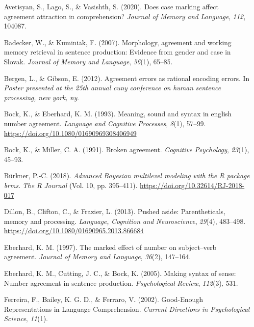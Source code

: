 \documentclass[
  english,
  doc,floatsintext]{apa6}
\newlength{\cslhangindent}
\newenvironment{cslreferences}%
  {\setlength{\parindent}{0pt}%
  \everypar{\setlength{\hangindent}{\cslhangindent}}\ignorespaces}%
  {\par}
\begin{document}
\hypertarget{refs}{}
\begin{cslreferences}
\leavevmode\hypertarget{ref-AvetisyanEtAl:2020}{}%
Avetisyan, S., Lago, S., \& Vasishth, S. (2020). Does case marking affect agreement attraction in comprehension? \emph{Journal of Memory and Language}, \emph{112}, 104087.

\leavevmode\hypertarget{ref-BadeckerKuminiak:2007}{}%
Badecker, W., \& Kuminiak, F. (2007). Morphology, agreement and working memory retrieval in sentence production: Evidence from gender and case in Slovak. \emph{Journal of Memory and Language}, \emph{56}(1), 65--85.

\leavevmode\hypertarget{ref-BergenGibson:2012}{}%
Bergen, L., \& Gibson, E. (2012). Agreement errors as rational encoding errors. In \emph{Poster presented at the 25th annual cuny conference on human sentence processing, new york, ny}.

\leavevmode\hypertarget{ref-BockEberhard:1993}{}%
Bock, K., \& Eberhard, K. M. (1993). Meaning, sound and syntax in english number agreement. \emph{Language and Cognitive Processes}, \emph{8}(1), 57--99. \url{https://doi.org/10.1080/01690969308406949}

\leavevmode\hypertarget{ref-Bock1991}{}%
Bock, K., \& Miller, C. A. (1991). Broken agreement. \emph{Cognitive Psychology}, \emph{23}(1), 45--93.

\leavevmode\hypertarget{ref-brms}{}%
Bürkner, P.-C. (2018). \emph{Advanced Bayesian multilevel modeling with the R package brms}. \emph{The R Journal} (Vol. 10, pp. 395--411). \url{https://doi.org/10.32614/RJ-2018-017}

\leavevmode\hypertarget{ref-Dillon2013a}{}%
Dillon, B., Clifton, C., \& Frazier, L. (2013). Pushed aside: Parentheticals, memory and processing. \emph{Language, Cognition and Neuroscience}, \emph{29}(4), 483--498. \url{https://doi.org/10.1080/01690965.2013.866684}

\leavevmode\hypertarget{ref-Eberhard:1997}{}%
Eberhard, K. M. (1997). The marked effect of number on subject--verb agreement. \emph{Journal of Memory and Language}, \emph{36}(2), 147--164.

\leavevmode\hypertarget{ref-EberhardEtAl:2005}{}%
Eberhard, K. M., Cutting, J. C., \& Bock, K. (2005). Making syntax of sense: Number agreement in sentence production. \emph{Psychological Review}, \emph{112}(3), 531.

\leavevmode\hypertarget{ref-FerreiraBaileyFerraro:2002}{}%
Ferreira, F., Bailey, K. G. D., \& Ferraro, V. (2002). Good-Enough Representations in Language Comprehension. \emph{Current Directions in Psychological Science}, \emph{11}(1).


\end{cslreferences}
\end{document}
